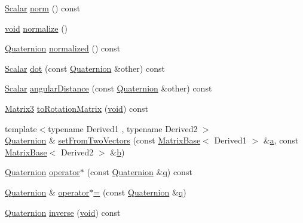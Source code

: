 \begin{DoxyCompactItemize}
\item 
\hyperlink{class_rotation_base_ae9cbe0a3a87dfe2fa70958d9fe948a09}{Scalar} \hyperlink{class_quaternion_a4effeec326ab5970a71373496b913253}{norm} () const 
\item 
\hyperlink{group___u_a_v_objects_plugin_ga444cf2ff3f0ecbe028adce838d373f5c}{void} \hyperlink{class_quaternion_a63cbfc0acf73550848211efb177f4521}{normalize} ()
\item 
\hyperlink{class_quaternion}{Quaternion} \hyperlink{class_quaternion_ac4cd49607acefb24d204b18d0b18b4d5}{normalized} () const 
\item 
\hyperlink{class_rotation_base_ae9cbe0a3a87dfe2fa70958d9fe948a09}{Scalar} \hyperlink{class_quaternion_a090d3926a926b5345f5f17082f1cdb26}{dot} (const \hyperlink{class_quaternion}{Quaternion} \&other) const 
\item 
\hyperlink{class_rotation_base_ae9cbe0a3a87dfe2fa70958d9fe948a09}{Scalar} \hyperlink{class_quaternion_a79486d849f76d1551c5005898a6b2a81}{angular\-Distance} (const \hyperlink{class_quaternion}{Quaternion} \&other) const 
\item 
\hyperlink{class_quaternion_a9fb40d1207bd7f8f5e2fcfefb353c7ba}{Matrix3} \hyperlink{class_quaternion_a0bc697c4a0504b94f759c1a5ff31795a}{to\-Rotation\-Matrix} (\hyperlink{group___u_a_v_objects_plugin_ga444cf2ff3f0ecbe028adce838d373f5c}{void}) const 
\item 
{\footnotesize template$<$typename Derived1 , typename Derived2 $>$ }\\\hyperlink{class_quaternion}{Quaternion} \& \hyperlink{class_quaternion_ac8a1f0d9361b62c6d5a5178cd5c23536}{set\-From\-Two\-Vectors} (const \hyperlink{class_matrix_base}{Matrix\-Base}$<$ Derived1 $>$ \&\hyperlink{glext_8h_ac8729153468b5dcf13f971b21d84d4e5}{a}, const \hyperlink{class_matrix_base}{Matrix\-Base}$<$ Derived2 $>$ \&\hyperlink{glext_8h_a6eba317e3cf44d6d26c04a5a8f197dcb}{b})
\item 
\hyperlink{class_quaternion}{Quaternion} \hyperlink{class_quaternion_ab26fe0a0d3aee99169952acfb31e899d}{operator$\ast$} (const \hyperlink{class_quaternion}{Quaternion} \&\hyperlink{glext_8h_afb30bc844faa48275d1c84294956a44b}{q}) const 
\item 
\hyperlink{class_quaternion}{Quaternion} \& \hyperlink{class_quaternion_ab6ae9c14ac677514ff6cdbaae45fe37e}{operator$\ast$=} (const \hyperlink{class_quaternion}{Quaternion} \&\hyperlink{glext_8h_afb30bc844faa48275d1c84294956a44b}{q})
\item 
\hyperlink{class_quaternion}{Quaternion} \hyperlink{class_quaternion_ab773683087c58b6d9916a7c4eb38887b}{inverse} (\hyperlink{group___u_a_v_objects_plugin_ga444cf2ff3f0ecbe028adce838d373f5c}{void}) const 

\end{DoxyCompactItemize}
